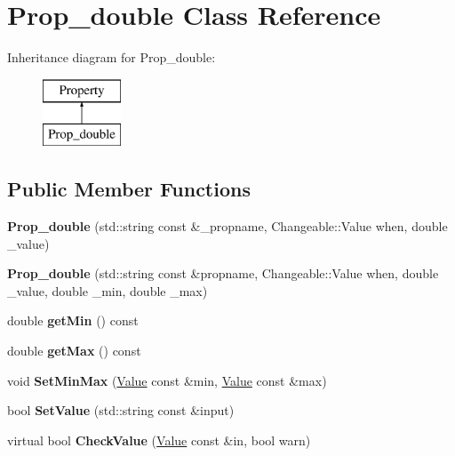 \hypertarget{classProp__double}{\section{Prop\-\_\-double Class Reference}
\label{classProp__double}
}
Inheritance diagram for Prop\-\_\-double\-:\begin{figure}[H]
\begin{center}
\leavevmode
\includegraphics[height=2.000000cm]{classProp__double}
\end{center}
\end{figure}
\subsection*{Public Member Functions}
\begin{DoxyCompactItemize}
\item 
\hypertarget{classProp__double_aa0facf6624ff88ee5d29fd70c5245ae9}{{\bfseries Prop\-\_\-double} (std\-::string const \&\-\_\-propname, Changeable\-::\-Value when, double \-\_\-value)}\label{classProp__double_aa0facf6624ff88ee5d29fd70c5245ae9}

\item 
\hypertarget{classProp__double_a97dda899f560863650267fe2591a2b33}{{\bfseries Prop\-\_\-double} (std\-::string const \&propname, Changeable\-::\-Value when, double \-\_\-value, double \-\_\-min, double \-\_\-max)}\label{classProp__double_a97dda899f560863650267fe2591a2b33}

\item 
\hypertarget{classProp__double_a718452077b18fc6764fb563117f5eae9}{double {\bfseries get\-Min} () const }\label{classProp__double_a718452077b18fc6764fb563117f5eae9}

\item 
\hypertarget{classProp__double_a2b8bf573e6be927830b78333b2fe5c40}{double {\bfseries get\-Max} () const }\label{classProp__double_a2b8bf573e6be927830b78333b2fe5c40}

\item 
\hypertarget{classProp__double_ac09c1c4686d723fe9bb19e78f72de790}{void {\bfseries Set\-Min\-Max} (\hyperlink{classValue}{Value} const \&min, \hyperlink{classValue}{Value} const \&max)}\label{classProp__double_ac09c1c4686d723fe9bb19e78f72de790}

\item 
\hypertarget{classProp__double_a29d1175964f35a4aa6b5e482e3dfdf00}{bool {\bfseries Set\-Value} (std\-::string const \&input)}\label{classProp__double_a29d1175964f35a4aa6b5e482e3dfdf00}

\item 
\hypertarget{classProp__double_a8db0d2798e637b0e5ad38b5ed3fd4abf}{virtual bool {\bfseries Check\-Value} (\hyperlink{classValue}{Value} const \&in, bool warn)}\label{classProp__double_a8db0d2798e637b0e5ad38b5ed3fd4abf}

\end{DoxyCompactItemize}



